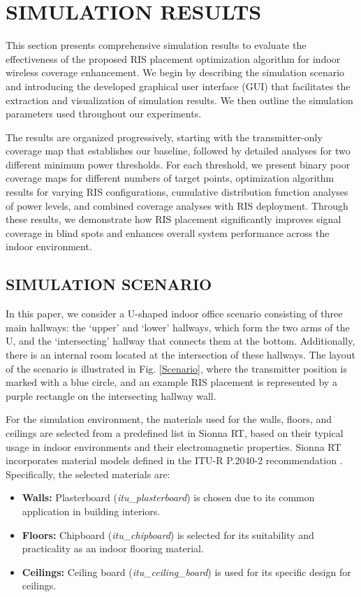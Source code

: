 \documentclass{IEEEoj}
\begin{document}
\section{SIMULATION RESULTS} \label{sec:results}
This section presents comprehensive simulation results to evaluate the effectiveness of the proposed RIS placement optimization algorithm for indoor wireless coverage enhancement. We begin by describing the simulation scenario and introducing the developed graphical user interface (GUI) that facilitates the extraction and visualization of simulation results. We then outline the simulation parameters used throughout our experiments.

The results are organized progressively, starting with the transmitter-only coverage map that establishes our baseline, followed by detailed analyses for two different minimum power thresholds. For each threshold, we present binary poor coverage maps for different numbers of target points, optimization algorithm results for varying RIS configurations, cumulative distribution function analyses of power levels, and combined coverage analyses with RIS deployment. Through these results, we demonstrate how RIS placement significantly improves signal coverage in blind spots and enhances overall system performance across the indoor environment.

\subsection{SIMULATION SCENARIO}
In this paper, we consider a U-shaped indoor office scenario consisting of three main hallways: the `upper' and `lower' hallways, which form the two arms of the U, and the `intersecting' hallway that connects them at the bottom. Additionally, there is an internal room located at the intersection of these hallways. The layout of the scenario is illustrated in Fig. \ref{Scenario}, where the transmitter position is marked with a blue circle, and an example RIS placement is represented by a purple rectangle on the intersecting hallway wall.

For the simulation environment, the materials used for the walls, floors, and ceilings are selected from a predefined list in Sionna RT, based on their typical usage in indoor environments and their electromagnetic properties. Sionna RT incorporates material models defined in the ITU-R P.2040-2 recommendation \cite{ITU}. Specifically, the selected materials are:  
\begin{itemize}
	\item \textbf{Walls:} Plasterboard (\textit{itu\_plasterboard}) is chosen due to its common application in building interiors.
	\item \textbf{Floors:} Chipboard (\textit{itu\_chipboard}) is selected for its suitability and practicality as an indoor flooring material.
	\item \textbf{Ceilings:} Ceiling board (\textit{itu\_ceiling\_board}) is used for its specific design for ceilings.
\end{itemize}
\end{document}
